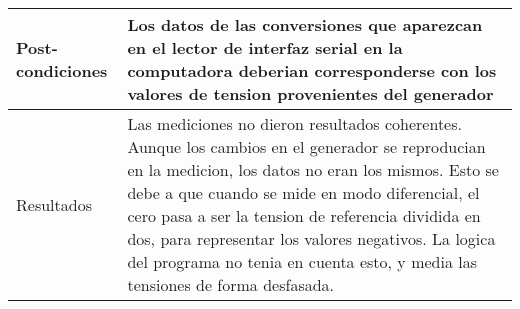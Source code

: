 \begin{table}[h]
\begin{tabular}{p{2cm} p{9cm}}
Post-condiciones & Los datos de las conversiones que aparezcan en el lector de interfaz serial en la computadora deberian corresponderse con los valores de tension provenientes del generador  
\\ 
\hline
Resultados       & Las mediciones no dieron resultados coherentes. Aunque los cambios en el generador se reproducian en la medicion, los datos no eran los mismos. Esto se debe a que cuando se mide en modo diferencial, el cero pasa a ser la tension de referencia dividida en dos, para representar los valores negativos. La logica del programa no tenia en cuenta esto, y media las tensiones de forma desfasada.                                                                                                                                                     
\end{tabular}
\end{table}


